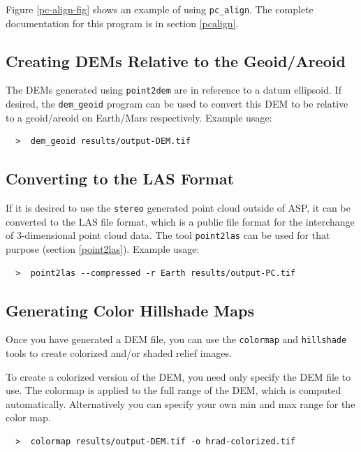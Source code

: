 Figure \ref{pc-align-fig} shows an example of using \texttt{pc\_align}.
The complete documentation for this program is in section
\ref{pcalign}.

\subsection{Creating DEMs Relative to the Geoid/Areoid}

The DEMs generated using \texttt{point2dem} are in reference to a datum
ellipsoid. If desired, the \texttt{dem\_geoid} program can be used to
convert this DEM to be relative to a geoid/areoid on Earth/Mars
respectively. Example usage:

\begin {verbatim}
  >  dem_geoid results/output-DEM.tif
\end{verbatim}

\subsection{Converting to the LAS Format}

If it is desired to use the \texttt{stereo} generated point cloud
outside of ASP, it can be converted to the LAS file format, which is a public file
format for the interchange of 3-dimensional point cloud data. The tool
\texttt{point2las} can be used for that purpose (section
\ref{point2las}). Example usage:

\begin {verbatim}
  >  point2las --compressed -r Earth results/output-PC.tif
\end{verbatim}

\subsection{Generating Color Hillshade Maps}
\label{genhillshade}

Once you have generated a \ac{DEM} file, you can use the
\texttt{colormap} and \texttt{hillshade} tools to create colorized
and/or shaded relief images.

To create a colorized version of the \ac{DEM}, you need only specify
the \ac{DEM} file to use. The colormap is applied to the full range of
the DEM, which is computed automatically.  Alternatively you can
specify your own min and max range for the color map.

\begin{verbatim}
  >  colormap results/output-DEM.tif -o hrad-colorized.tif
\end{verbatim}

